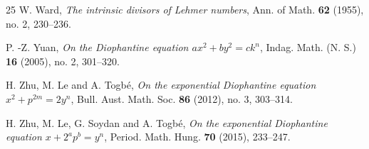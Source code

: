 \documentclass[12pt, 14paper,reqno]{amsart}
\theoremstyle{plain}
\theoremstyle{proof}
\numberwithin{equation}{section}
\begin{document}
\begin{thebibliography}{25}
 W. Ward, {\it The intrinsic divisors of Lehmer numbers}, Ann. of Math. {\bf 62} (1955), no. 2, 230--236. 

 P. -Z. Yuan, {\it On the Diophantine equation $ax^2 + by^2 = ck^n$}, Indag. Math. (N. S.) {\bf 16} (2005), no. 2, 301--320.

 H. Zhu, M. Le and A. Togb\'e, {\it On the exponential Diophantine equation $x^2 +p^{2m} = 2y^n$}, Bull. Aust. Math. Soc. {\bf 86} (2012), no. 3, 303--314.

 H. Zhu, M. Le, G. Soydan and A. Togb\'e, {\it On the exponential Diophantine equation $x +2^a p^b = y^n$},  Period. Math. Hung. {\bf 70} (2015), 233--247.
\end{thebibliography}
\end{document}
